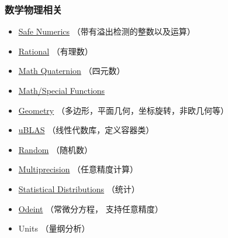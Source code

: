 \subsubsection{数学物理相关}
\begin{itemize}
\item \href{https://www.boost.org/doc/libs/1_81_0/libs/safe_numerics/doc/html/index.html}{Safe Numerics} （带有溢出检测的整数以及运算）
\item \href{https://www.boost.org/doc/libs/1_81_0/libs/rational/}{Rational} （有理数）
\item \href{https://www.boost.org/doc/libs/1_81_0/libs/math/doc/html/quaternions.html}{Math Quaternion} （四元数）
\item \href{https://www.boost.org/doc/libs/1_81_0/libs/math/doc/html/special.html}{Math/Special Functions}
\item \href{https://www.boost.org/doc/libs/1_81_0/libs/geometry/doc/html/index.html}{Geometry} （多边形，平面几何，坐标旋转，非欧几何等）
\item \href{https://www.boost.org/doc/libs/1_81_0/libs/numeric/ublas/doc/index.html}{uBLAS} （线性代数库，定义容器类）
\item \href{https://www.boost.org/doc/libs/1_81_0/doc/html/boost_random.html}{Random} （随机数）
\item \href{https://www.boost.org/doc/libs/1_72_0/libs/multiprecision/doc/html/index.html}{Multiprecision} （任意精度计算）
\item \href{https://www.boost.org/doc/libs/1_81_0/libs/math/doc/html/dist.html}{Statistical Distributions} （统计）
\item \href{https://www.boost.org/doc/libs/1_81_0/libs/numeric/odeint/doc/html/index.html}{Odeint} （常微分方程， 支持任意精度）
\item Units （量纲分析）
\end{itemize}

